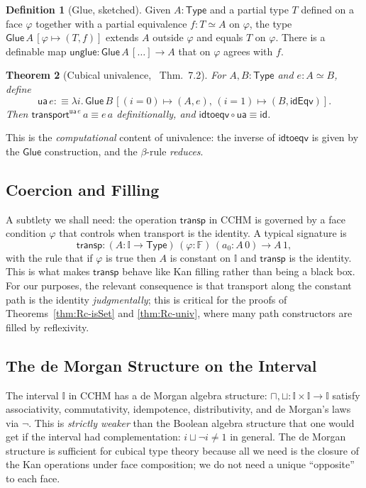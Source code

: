 \documentclass[12pt]{article}
\newtheorem{theorem}{Theorem}[section]
\theoremstyle{definition}
\newtheorem{definition}[theorem]{Definition}
\theoremstyle{remark}
\newcommand{\Type}{\mathsf{Type}}
\newcommand{\transport}{\mathsf{transport}}
\newcommand{\ua}{\mathsf{ua}}
\newcommand{\idtoeqv}{\mathsf{idtoeqv}}
\newcommand{\eqv}{\simeq}
\newcommand{\II}{\mathbb{I}}
\newcommand{\transp}{\mathsf{transp}}
\newcommand{\Glue}{\mathsf{Glue}}
\begin{document}
\begin{definition}[Glue, sketched]
\label{def:glue}
Given $A : \Type$ and a partial type $T$ defined on a face $\varphi$
together with a partial equivalence $f : T \eqv A$ on $\varphi$, the
type $\Glue\,A\,[\varphi \mapsto (T, f)]$ extends $A$ outside $\varphi$
and equals $T$ on $\varphi$. There is a definable map
$\mathsf{unglue} : \Glue\,A\,[\dots] \to A$ that on $\varphi$ agrees
with $f$.
\end{definition}

\begin{theorem}[Cubical univalence,~\cite{CCHM} Thm.~7.2]
\label{thm:cubical-ua}
For $A, B : \Type$ and $e : A \eqv B$, define
\[
\ua\,e :\equiv \lambda i.\, \Glue\,B\,[(i = 0) \mapsto (A, e),\,
                                   (i = 1) \mapsto (B, \mathsf{idEqv})].
\]
Then $\transport^{\ua\,e}\,a \equiv e\,a$ definitionally, and
$\idtoeqv \circ \ua \equiv \mathsf{id}$.
\end{theorem}

This is the \emph{computational} content of univalence: the inverse of
$\idtoeqv$ is given by the $\Glue$ construction, and the $\beta$-rule
\emph{reduces}.

\subsection{Coercion and Filling}

A subtlety we shall need: the operation $\transp$ in CCHM is governed
by a face condition $\varphi$ that controls when transport is the
identity. A typical signature is
\[
\transp : (A : \II \to \Type)\,(\varphi : \mathbb{F})\,(a_0 : A\,0) \to A\,1,
\]
with the rule that if $\varphi$ is true then $A$ is constant on $\II$
and $\transp$ is the identity. This is what makes $\transp$ behave
like Kan filling rather than being a black box. For our purposes, the
relevant consequence is that transport along the constant path is the
identity \emph{judgmentally}; this is critical for the proofs of
Theorems~\ref{thm:Rc-isSet} and \ref{thm:Rc-univ}, where many path
constructors are filled by reflexivity.

\subsection{The de Morgan Structure on the Interval}

The interval $\II$ in CCHM has a de Morgan algebra structure:
$\sqcap, \sqcup : \II \times \II \to \II$ satisfy associativity,
commutativity, idempotence, distributivity, and de Morgan's laws via
$\neg$. This is \emph{strictly weaker} than the Boolean algebra
structure that one would get if the interval had complementation:
$i \sqcup \neg i \neq 1$ in general. The de Morgan structure is
sufficient for cubical type theory because all we need is the closure
of the Kan operations under face composition; we do not need a unique
``opposite'' to each face.
\end{document}
